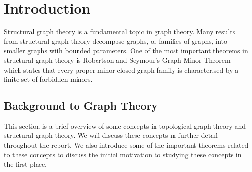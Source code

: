 \chapter{Introduction}\label{sec:introduction}
Structural graph theory is a fundamental topic in graph theory. Many results from structural graph theory decompose graphs, or families of graphs, into smaller graphs with bounded parameters. One of the most important theorems in structural graph theory is Robertson and Seymour's Graph Minor Theorem \cite{robertsonGraphMinorsXX2004} which states that every proper minor-closed graph family is characterised by a finite set of forbidden minors.





\section{Background to Graph Theory}
This section is a brief overview of some concepts in topological graph theory and structural graph theory. We will discuss these concepts in further detail throughout the report. We also introduce some of the important theorems related to these concepts to discuss the initial motivation to studying these concepts in the first place. 















